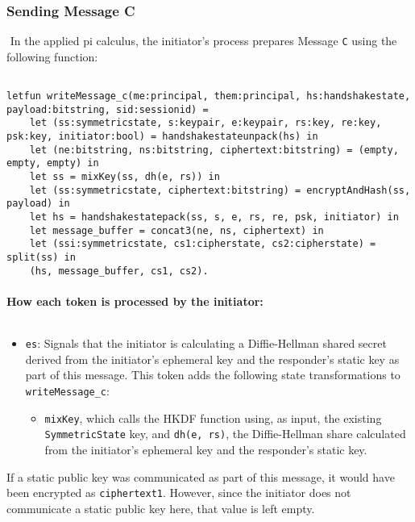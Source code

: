 \subsubsection{Sending Message C}$ $
In the applied pi calculus, the initiator's process prepares Message \texttt{C} using the following function:


\begin{lstlisting}

letfun writeMessage_c(me:principal, them:principal, hs:handshakestate, payload:bitstring, sid:sessionid) =
	let (ss:symmetricstate, s:keypair, e:keypair, rs:key, re:key, psk:key, initiator:bool) = handshakestateunpack(hs) in
	let (ne:bitstring, ns:bitstring, ciphertext:bitstring) = (empty, empty, empty) in
	let ss = mixKey(ss, dh(e, rs)) in
	let (ss:symmetricstate, ciphertext:bitstring) = encryptAndHash(ss, payload) in
	let hs = handshakestatepack(ss, s, e, rs, re, psk, initiator) in
	let message_buffer = concat3(ne, ns, ciphertext) in
	let (ssi:symmetricstate, cs1:cipherstate, cs2:cipherstate) = split(ss) in
	(hs, message_buffer, cs1, cs2).

\end{lstlisting}

\paragraph{How each token is processed by the initiator:}$ $

\begin{itemize}

\item \texttt{es}: Signals that the initiator is calculating a Diffie-Hellman shared secret derived from the initiator's ephemeral key and the responder's static key as part of this message. This token adds the following state transformations to \texttt{writeMessage\_c}:
\begin{itemize}

\item \texttt{mixKey}, which calls the HKDF function using, as input, the existing \texttt{SymmetricState} key, and \texttt{dh(e, rs)}, the Diffie-Hellman share calculated from the initiator's ephemeral key and the responder's static key.
\end{itemize}


\end{itemize}
If a static public key was communicated as part of this message, it would have been encrypted as \texttt{ciphertext1}. However, since the initiator does not communicate a static public key here, that value is left empty.


